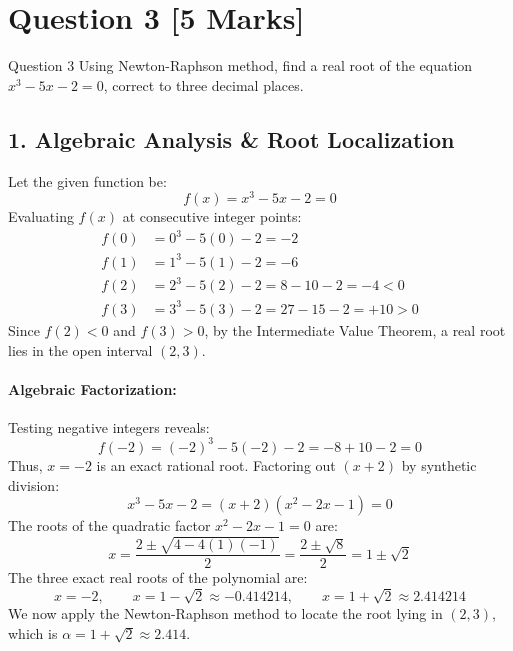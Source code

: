 \documentclass[11pt,a4paper]{article}
\begin{document}
\newpage

\section*{Question 3 \hfill \normalsize\normalfont\color{darkgray}[5 Marks]}

\begin{questionbox}{Question 3}
Using Newton-Raphson method, find a real root of the equation $x^3 - 5x - 2 = 0$, correct to three decimal places.
\end{questionbox}

\subsection*{1. Algebraic Analysis \& Root Localization}
Let the given function be:
\begin{equation}
f(x) = x^3 - 5x - 2 = 0
\end{equation}
Evaluating $f(x)$ at consecutive integer points:
\begin{align*}
f(0) &= 0^3 - 5(0) - 2 = -2 \\
f(1) &= 1^3 - 5(1) - 2 = -6 \\
f(2) &= 2^3 - 5(2) - 2 = 8 - 10 - 2 = -4 < 0 \\
f(3) &= 3^3 - 5(3) - 2 = 27 - 15 - 2 = +10 > 0
\end{align*}
Since $f(2) < 0$ and $f(3) > 0$, by the Intermediate Value Theorem, a real root lies in the open interval $(2, 3)$.

\paragraph{Algebraic Factorization:} Testing negative integers reveals:
\[
f(-2) = (-2)^3 - 5(-2) - 2 = -8 + 10 - 2 = 0
\]
Thus, $x = -2$ is an exact rational root. Factoring out $(x + 2)$ by synthetic division:
\[
x^3 - 5x - 2 = (x + 2)(x^2 - 2x - 1) = 0
\]
The roots of the quadratic factor $x^2 - 2x - 1 = 0$ are:
\[
x = \frac{2 \pm \sqrt{4 - 4(1)(-1)}}{2} = \frac{2 \pm \sqrt{8}}{2} = 1 \pm \sqrt{2}
\]
The three exact real roots of the polynomial are:
\begin{equation}
x = -2, \qquad x = 1 - \sqrt{2} \approx -0.414214, \qquad x = 1 + \sqrt{2} \approx \mathbf{2.414214}
\end{equation}
We now apply the Newton-Raphson method to locate the root lying in $(2, 3)$, which is $\alpha = 1 + \sqrt{2} \approx 2.414$.
\end{document}
